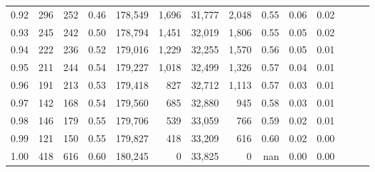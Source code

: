 \begin{tabular}{rrrrrrrrrrrrrr}
0.92 &    296 &  252 &  0.46 &  178,549 &    1,696 &  31,777 &   2,048 &  0.55 &  0.06 &      0.02 \\
0.93 &    245 &  242 &  0.50 &  178,794 &    1,451 &  32,019 &   1,806 &  0.55 &  0.05 &      0.02 \\
0.94 &    222 &  236 &  0.52 &  179,016 &    1,229 &  32,255 &   1,570 &  0.56 &  0.05 &      0.01 \\
0.95 &    211 &  244 &  0.54 &  179,227 &    1,018 &  32,499 &   1,326 &  0.57 &  0.04 &      0.01 \\
0.96 &    191 &  213 &  0.53 &  179,418 &      827 &  32,712 &   1,113 &  0.57 &  0.03 &      0.01 \\
0.97 &    142 &  168 &  0.54 &  179,560 &      685 &  32,880 &     945 &  0.58 &  0.03 &      0.01 \\
0.98 &    146 &  179 &  0.55 &  179,706 &      539 &  33,059 &     766 &  0.59 &  0.02 &      0.01 \\
0.99 &    121 &  150 &  0.55 &  179,827 &      418 &  33,209 &     616 &  0.60 &  0.02 &      0.00 \\
1.00 &    418 &  616 &  0.60 &  180,245 &        0 &  33,825 &       0 &   nan &  0.00 &      0.00 \\
\bottomrule
\end{tabular}
